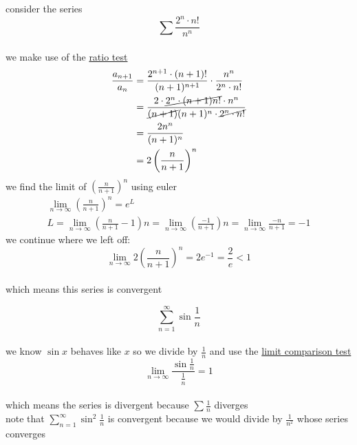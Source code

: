 \documentclass[a4paper,12pt]{article}
\newcommand{\?}{\stackrel{?}{=}}
\begin{document}
\begin{definition}
\begin{my_example}
consider the series\\[0pt]
\[
  \sum \frac{2^n \cdot n!}{n^n}
\]\\[0pt]
we make use of the \hyperref[sec:orgcc05a6d]{ratio test}\\[0pt]
\begin{align*}
  \frac{a_{n+1}}{a_n} &= \frac{2^{n+1} \cdot (n+1)!}{(n+1)^{n+1}} \cdot \frac{n^n}{2^n \cdot n!}\\
  &= \frac{2 \cdot \cancel{2^n \cdot (n+1)n!} \cdot n^n}{\cancel{(n+1)}(n+1)^n \cdot \cancel{2^n \cdot n!}}\\
  &= \frac{2n^n}{(n+1)^n}\\
  &= 2\left(\frac{n}{n+1}\right)^n
\end{align*}
we find the limit of \(\left(\frac{n}{n+1}\right)^n\) using euler\\[0pt]
\begin{gather*}
  \lim_{n\to\infty} \left(\frac{n}{n+1}\right)^n = e^L\\
  L = \lim_{n\to\infty} \left(\frac{n}{n+1} - 1\right)n = \lim_{n\to\infty} \left(\frac{-1}{n+1}\right)n = \lim_{n\to\infty} \frac{-n}{n+1} = -1
\end{gather*}
we continue where we left off:\\[0pt]
\[
 \lim_{n\to\infty} 2\left(\frac{n}{n+1}\right)^n = 2e^{-1} = \frac{2}{e} < 1
\]\\[0pt]
which means this series is convergent\\[0pt]
\end{my_example}

\begin{my_example}
\[
  \sum_{n=1}^\infty \sin\frac1n
\]\\[0pt]
we know \(\sin x\) behaves like \(x\) so we divide by \(\frac1n\) and use the \hyperref[sec:org793987b]{limit comparison test}\\[0pt]
\[
  \lim_{n\to\infty} \frac{\sin\frac1n}{\frac1n} = 1
\]\\[0pt]
which means the series is divergent because \(\sum \frac1n\) diverges\\[0pt]
note that \(\sum_{n=1}^\infty \sin^2\frac1n\) is convergent because we would divide by \(\frac1{n^2}\) whose series converges\\[0pt]
\end{my_example}
\end{definition}
\end{document}
